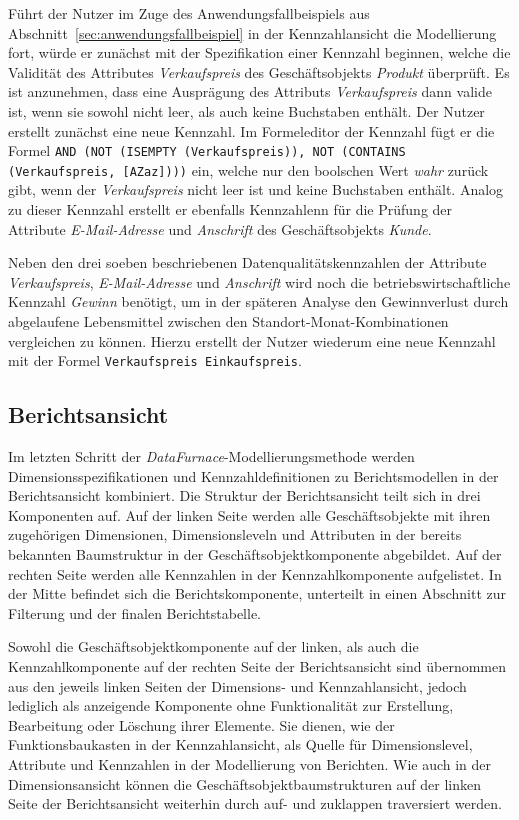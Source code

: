 \documentclass[
  language=german, %
  type=bachelor%
]{isthesis}
\begin{document}
\begin{content}
  Führt der Nutzer im Zuge des Anwendungsfallbeispiels aus
  Abschnitt~\ref{sec:anwendungsfallbeispiel} in der Kennzahlansicht die
  Modellierung fort, würde er zunächst mit der Spezifikation einer Kennzahl
  beginnen, welche die Validität des Attributes \textit{Verkaufspreis} des
  Geschäftsobjekts \textit{Produkt} überprüft. Es ist anzunehmen, dass eine
  Ausprägung des Attributs \textit{Verkaufspreis} dann valide ist, wenn sie
  sowohl nicht leer, als auch keine Buchstaben enthält. Der Nutzer erstellt
  zunächst eine neue Kennzahl. Im Formeleditor der Kennzahl fügt er die Formel
  \texttt{AND (NOT (ISEMPTY (Verkaufspreis)), NOT (CONTAINS (Verkaufspreis,
  [A\textminus{}Za\textminus{}z])))} ein, welche nur den boolschen Wert
  \textit{wahr} zurück gibt, wenn der \textit{Verkaufspreis} nicht leer ist und
  keine Buchstaben enthält. Analog zu dieser Kennzahl erstellt er ebenfalls
  Kennzahlenn für die Prüfung der Attribute \textit{E-Mail-Adresse} und
  \textit{Anschrift} des Geschäftsobjekts \textit{Kunde}.

  Neben den drei soeben beschriebenen Datenqualitätskennzahlen der Attribute
  \textit{Verkaufspreis}, \textit{E-Mail-Adresse} und \textit{Anschrift} wird
  noch die betriebswirtschaftliche Kennzahl \textit{Gewinn} benötigt, um in der
  späteren Analyse den Gewinnverlust durch abgelaufene Lebensmittel zwischen
  den Standort-Monat-Kombinationen vergleichen zu können. Hierzu erstellt der
  Nutzer wiederum eine neue Kennzahl mit der Formel \texttt{Verkaufspreis \textminus{}
  Einkaufspreis}.


  \subsection{Berichtsansicht}

  Im letzten Schritt der \textit{DataFurnace}-Modellierungsmethode werden
  Dimensionsspezifikationen und Kennzahldefinitionen zu Berichtsmodellen in der
  Berichtsansicht kombiniert. Die Struktur der Berichtsansicht teilt sich in
  drei Komponenten auf. Auf der linken Seite werden alle Geschäftsobjekte mit
  ihren zugehörigen Dimensionen, Dimensionsleveln und Attributen in der
  bereits bekannten Baumstruktur in der Geschäftsobjektkomponente abgebildet.
  Auf der rechten Seite werden alle Kennzahlen in der Kennzahlkomponente
  aufgelistet. In der Mitte befindet sich die Berichtskomponente, unterteilt in
  einen Abschnitt zur Filterung und der finalen Berichtstabelle.

  Sowohl die Geschäftsobjektkomponente auf der linken, als auch die
  Kennzahlkomponente auf der rechten Seite der Berichtsansicht sind übernommen
  aus den jeweils linken Seiten der Dimensions- und Kennzahlansicht, jedoch
  lediglich als anzeigende Komponente ohne Funktionalität zur Erstellung,
  Bearbeitung oder Löschung ihrer Elemente. Sie dienen, wie der
  Funktionsbaukasten in der Kennzahlansicht, als Quelle für Dimensionslevel,
  Attribute und Kennzahlen in der Modellierung von Berichten. Wie auch in der
  Dimensionsansicht können die Geschäftsobjektbaumstrukturen auf der linken
  Seite der Berichtsansicht weiterhin durch auf- und zuklappen traversiert
  werden.


\end{content}
\end{document}
